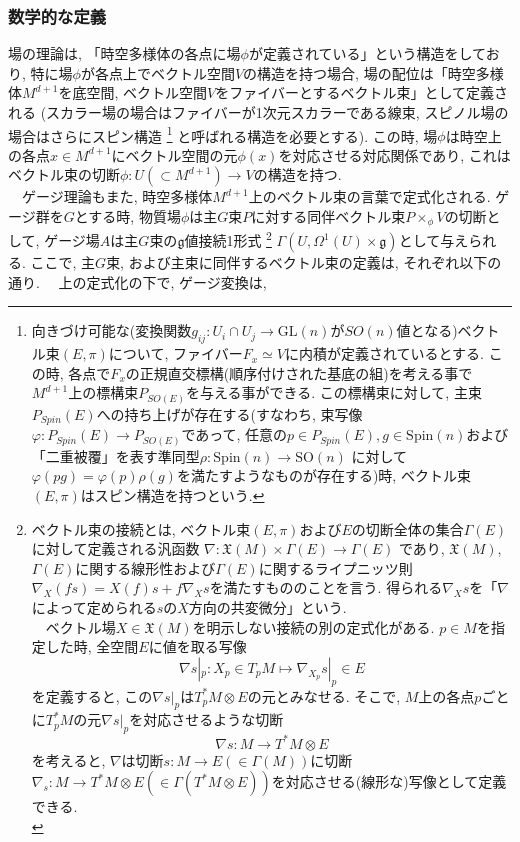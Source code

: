 \subsubsection{数学的な定義}
場の理論は, 「時空多様体の各点に場$\phi$が定義されている」という構造をしており, 
特に場$\phi$が各点上でベクトル空間$V$の構造を持つ場合, 
場の配位は「時空多様体$M^{d+1}$を底空間, ベクトル空間$V$をファイバーとするベクトル束」として定義される
(スカラー場の場合はファイバーが1次元スカラーである線束, スピノル場の場合はさらにスピン構造
\footnote{向きづけ可能な(変換関数$g_{ij}: U_{i}\cap U_j\to \mathrm{GL}(n)$が$SO(n)$値となる)ベクトル束$(E, \pi)$について, 
ファイバー$F_x\simeq V$に内積が定義されているとする. 
この時, 各点で$F_x$の正規直交標構(順序付けされた基底の組)を考える事で
$M^{d+1}$上の標構束$P_{SO(E)}$を与える事ができる. 
この標構束に対して, 主束$P_{Spin}(E)$への持ち上げが存在する(すなわち, 束写像$\varphi: P_{Spin}(E)\to P_{SO(E)}$であって, 
任意の$p\in P_{Spin}(E), g\in \mathrm{Spin}(n)$および「二重被覆」を表す準同型$\rho: \mathrm{Spin}(n)\to \mathrm{SO}(n)$
に対して$\varphi(pg) = \varphi(p)\rho(g)$を満たすようなものが存在する)時, 
ベクトル束$(E, \pi)$はスピン構造を持つという. }%
と呼ばれる構造を必要とする). 
この時, 場$\phi$は時空上の各点$x\in M^{d+1}$にベクトル空間の元$\phi(x)$を対応させる対応関係であり, 
これはベクトル束の切断$\phi: U(\subset M^{d+1})\to V$の構造を持つ. \\
　ゲージ理論もまた, 時空多様体$M^{d+1}$上のベクトル束の言葉で定式化される. 
ゲージ群を$G$とする時, 物質場$\phi$は主$G$束$P$に対する同伴ベクトル束$P\times_\phi V$の切断として, 
ゲージ場$A$は主$G$束の$\mathfrak{g}$値接続1形式
\footnote{ベクトル束の接続とは, ベクトル束$(E, \pi)$および$E$の切断全体の集合$\Gamma(E)$に対して定義される汎函数
$\nabla : \mathfrak{X}(M)\times \Gamma(E)\to \Gamma(E)$
であり, $\mathfrak{X}(M)$, $\Gamma(E)$に関する線形性および$\Gamma(E)$に関するライプニッツ則
$\nabla_{X}(fs) = X(f)s + f\nabla_X s$を満たすもののことを言う. 
得られる$\nabla_X s$を「$\nabla$によって定められる$s$の$X$方向の共変微分」という. \\
　ベクトル場$X\in \mathfrak{X}(M)$を明示しない接続の別の定式化がある. 
$p\in M$を指定した時, 全空間$E$に値を取る写像
$$\nabla s|_p : X_p\in T_{p}M \mapsto \nabla_{X_p}s|_p \in E$$
を定義すると, この$\nabla s|_p$は$T^{*}_p M\otimes E$の元とみなせる. 
そこで, $M$上の各点$p$ごとに$T^{*}_p M$の元$\nabla s|_p$を対応させるような切断
$$\nabla s: M \to T^{*}M\otimes E$$を考えると, 
$\nabla$は切断$s: M\to E(\in \Gamma(M))$に切断$\nabla_s: M\to T^{*}M\otimes E (\in \Gamma(T^{*}M\otimes E))$を対応させる(線形な)写像として定義できる. \\
}%
$\Gamma(U, \Omega^1(U)\times \mathfrak{g})$として与えられる. 
ここで, 主$G$束, および主束に同伴するベクトル束の定義は, それぞれ以下の通り. 
　上の定式化の下で, ゲージ変換は, 
